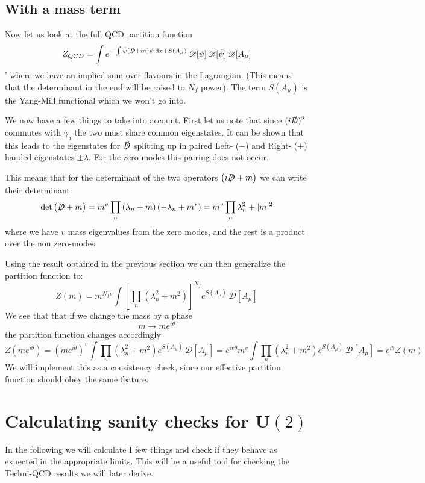 \documentclass[a4,10pt,titlepage]{article}
\renewcommand\[{\begin{equation*}}
\renewcommand\]{\end{equation*}}
\newcommand{\be}{\begin{equation}}
\newcommand{\ee}{\end{equation}}
\numberwithin{equation}{section}
\newcommand{\PD}{\mathscr{D}}
\newcommand{\lp}{\left}
\newcommand{\rp}{\right}
\newcommand{\D}{\slashed{D}}
\begin{document}
\subsection{With a mass term}
Now let us look at the full QCD partition function
\be
Z_{QCD}=\int e^{-\int \bar \psi (\D+m) \psi\:\dd x+S(A_\mu)}\:\PD[\psi]\:\PD[\bar\psi]\:\PD[A_\mu]
\ee'
where we have an implied sum over flavours in the Lagrangian. (This means that the determinant in the end will be raised to $N_f$ power). The term $S(A_\mu)$ is the Yang-Mill functional which we won't go into.

We now have a few things to take into account. First let us note that since $(i\D)^2$ commutes with $\gamma_5$ the two must share common eigenstates. It can be shown that this leads to the eigenstates for $\D$ splitting up in paired Left- ($-$) and Right- ($+$) handed  eigenstates $\pm \lambda$. For the zero modes this pairing does not occur.

This means that for the determinant of the two operators $\lp(i\D+m\rp)$ we can write their determinant:
\be
\det \lp(\D+m\rp)=m^v
\prod_n\lp( \lambda_n+m \rp)\lp( -\lambda_n+m^* \rp)=m^v 
\prod_n\lambda_n^2+|m|^2
\ee
where we have $v$ mass eigenvalues from the zero modes, and the rest is a product over the non zero-modes.

Using the result obtained in the previous section we can then generalize the partition function to:
\be
Z(m)=m^{N_fv}\int\lp[\prod_n\lp(\lambda_n^2+m^2  \rp)\rp]^{N_f}e^{S(A_\mu)}\:\PD[A_\mu]
\ee
We see that that if we change the mass by a phase
\[
m\rightarrow me^{i\theta}
\]
the partition function changes accordingly
\[
Z\lp(me^{i\theta}\rp)=\lp(me^{i\theta}\rp)^v\int\prod_n\lp(\lambda_n^2+m^2  \rp)e^{S(A_\mu)}\:\PD[A_\mu]=e^{iv\theta}m^v\int\prod_n\lp(\lambda_n^2+m^2  \rp)e^{S(A_\mu)}\:\PD[A_\mu]=e^{i\theta}Z(m)
\]
We will implement this as a consistency check, since our effective partition function should obey the same feature.

\section{Calculating sanity checks for U$(2)$}

In the following we will calculate I few things and check if they behave as expected in the appropriate limits. This will be a useful tool for checking the Techni-QCD results we will later derive. 
\end{document}
